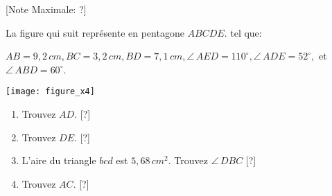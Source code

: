 \begin{question}
  \hspace*{\fill} [Note Maximale: ?]\par
  \medskip
  \noindent La figure qui suit représente en pentagone $ABCDE$. tel que:\par
  \noindent $AB = 9,2\,cm,  BC = 3,2\,cm, BD = 7,1\,cm, \angle\,AED = 110^\circ, \angle\,ADE = 52^\circ,$ et $\angle\,ABD = 60^\circ$.\par
  \medskip
  \begin{center} %
    \texttt{[image: figure\_x4]}\par
  \end{center} %
  \begin{enumerate}[label=(\alph*)]
    \item Trouvez $AD$.\hspace*{\fill} [?]
    \item Trouvez $DE$.\hspace*{\fill} [?]
    \item L'aire du triangle $bcd$ est $5,68\,cm^2$. Trouvez $\angle\,DBC$\hspace*{\fill} [?]
    \item Trouvez $AC$.\hspace*{\fill} [?]
  \end{enumerate}
\end{question}
